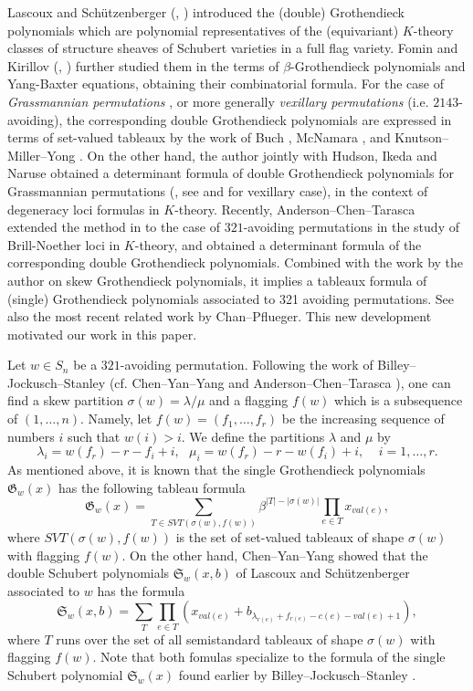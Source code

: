 \documentclass[11pt,reqno,sumlimits]{amsart}
\newcommand{\frakG}{{\mathfrak G}}
\newcommand{\frakS}{{\mathfrak S}}
\newcommand{\FSVT}{{SVT}}
\theoremstyle{definition}
\numberwithin{equation}{section}
\begin{document}
Lascoux and Sch{\"u}tzenberger (\cite{LascouxSchutzenberger3}, \cite{Lascoux1}) introduced the (double) Grothendieck polynomials which are polynomial representatives of the (equivariant) $K$-theory classes of structure sheaves of Schubert varieties in a full flag variety. Fomin and Kirillov (\cite{GrothendieckFomin}, \cite{DoubleGrothendieckFomin}) further studied them in the terms of $\beta$-Grothendieck polynomials and Yang-Baxter equations, obtaining their combinatorial formula. For the case of {\it Grassmannian permutations} , or more generally {\it vexillary permutations} (i.e. $2143$-avoiding), the corresponding double Grothendieck polynomials are expressed in terms of set-valued tableaux by the work of Buch \cite{BuchLRrule}, McNamara \cite{McNamara}, and Knutson--Miller--Yong \cite{KnutsonMillerYong}. On the other hand, the author jointly with Hudson, Ikeda and Naruse obtained a determinant formula of double Grothendieck polynomials for Grassmannian permutations (\cite{HIMN}, see \cite{Anderson2016} and \cite{HudsonMatsumura2} for vexillary case), in the context of degeneracy loci formulas in $K$-theory. Recently, Anderson--Chen--Tarasca \cite{AndersonChenTarasca} extended the method in \cite{HIMN} to the case of $321$-avoiding permutations in the study of Brill-Noether loci in $K$-theory, and obtained a determinant formula of the corresponding double Grothendieck polynomials. Combined with the work \cite{MatsumuraFlagged} by the author on skew Grothendieck polynomials, it implies a tableaux formula of (single) Grothendieck polynomials associated to 321 avoiding permutations. See also the most recent related work \cite{ChanPflueger} by Chan--Pflueger. This new development motivated our work in this paper.

Let $w\in S_n$ be a $321$-avoiding permutation. Following the work of Billey--Jockusch--Stanley \cite{BilleyJockuschStanley} (cf. Chen--Yan--Yang \cite{ChenYanYang} and Anderson--Chen--Tarasca \cite{AndersonChenTarasca}), one can find a skew partition $\sigma(w)=\lambda/\mu$ and a flagging $f(w)$ which is a subsequence of $(1,\dots, n)$. Namely, let $f(w)=(f_1,\dots, f_r)$ be the increasing sequence of numbers $i$ such that $w(i)>i$. We define the partitions $\lambda$ and $\mu$ by
\[
\lambda_i=w(f_r) - r -f_i+i, \ \ \ \mu_i=w(f_r) - r - w(f_i)+i, \ \ \ \ \ i=1,\dots,r.
\]
As mentioned above, it is known that the single Grothendieck polynomials $\frakG_w(x)$ has the following tableau formula
\[
\frakG_w(x) = \sum_{T \in \FSVT(\sigma(w),f(w))} \beta^{|T|-|\sigma(w)|} \prod_{e\in T}x_{val(e)}, 
\]
where $\FSVT(\sigma(w),f(w))$ is the set of set-valued tableaux of shape $\sigma(w)$ with flagging $f(w)$. On the other hand, Chen--Yan--Yang \cite{ChenYanYang} showed that the double Schubert polynomials $\frakS_w(x,b)$ of Lascoux and Sch{\"u}tzenberger associated to $w$ has the formula
\[
\frakS_w(x,b) = \sum_{T}\prod_{e\in T} (x_{val(e)}+ b_{\lambda_{r(e)}+f_{r(e)} - c(e) - val(e) + 1}),
\]
where $T$ runs over the set of all semistandard tableaux of shape $\sigma(w)$ with flagging $f(w)$. Note that both fomulas specialize to the formula of the single Schubert polynomial $\frakS_w(x)$ found earlier by Billey--Jockusch--Stanley \cite{BilleyJockuschStanley}.
\end{document}
